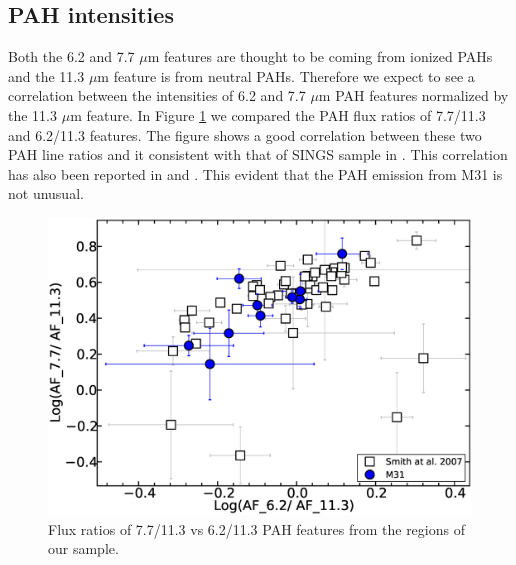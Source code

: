 
\subsection{PAH intensities}
\label{sect:pah_ratios}

Both the 6.2 and 7.7 $\mu$m features are thought to be coming from ionized PAHs and the 11.3 $\mu$m feature is from neutral PAHs. Therefore we expect to see a correlation between the intensities of 6.2 and 7.7 $\mu$m PAH features normalized by the 11.3 $\mu$m feature. In Figure \ref{PAHlines} we compared the PAH flux ratios of 7.7/11.3  and 6.2/11.3 features. The figure shows a good correlation between these two PAH line ratios and it consistent with that of SINGS sample in \citet{Smith:2007lr}. This correlation has also been reported in \citet{Galliano2008} and \citet{Vermeij2002}. This evident that the PAH emission from M31 is not unusual. 

\begin{figure}
\centering
\includegraphics[scale = 0.25]{./SINGSnMy.eps}
\caption{ Flux ratios of 7.7/11.3 vs 6.2/11.3 PAH features from the regions of our sample.}
\label{PAHlines}
\end{figure}

